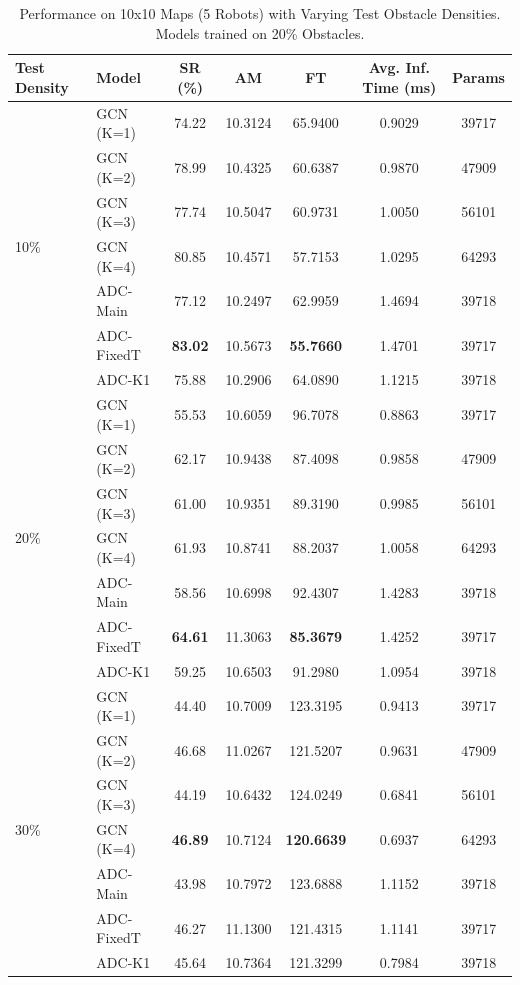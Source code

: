 \begin{table}[htbp]
    \centering
    \caption{Performance on 10x10 Maps (5 Robots) with Varying Test Obstacle Densities. Models trained on 20\% Obstacles.}
    \label{tab:density_perf_20D_train}
    \scriptsize %
    \begin{tabular}{llccccc}
        \toprule
        Test Density & Model & SR (\%) & AM & FT & Avg. Inf. Time (ms) & Params \\
        \midrule
        \multirow{7}{*}{10\%}
        & GCN (K=1) & 74.22 & 10.3124 & 65.9400 & 0.9029 & 39717 \\
        & GCN (K=2) & 78.99 & 10.4325 & 60.6387 & 0.9870 & 47909 \\
        & GCN (K=3) & 77.74 & 10.5047 & 60.9731 & 1.0050 & 56101 \\
        & GCN (K=4) & 80.85 & 10.4571 & 57.7153 & 1.0295 & 64293 \\
        & ADC-Main & 77.12 & 10.2497 & 62.9959 & 1.4694 & 39718 \\
        & ADC-FixedT & \textbf{83.02} & 10.5673 & \textbf{55.7660} & 1.4701 & 39717 \\
        & ADC-K1 & 75.88 & 10.2906 & 64.0890 & 1.1215 & 39718 \\
        \midrule
        \multirow{7}{*}{20\%}
        & GCN (K=1) & 55.53 & 10.6059 & 96.7078 & 0.8863 & 39717 \\
        & GCN (K=2) & 62.17 & 10.9438 & 87.4098 & 0.9858 & 47909 \\
        & GCN (K=3) & 61.00 & 10.9351 & 89.3190 & 0.9985 & 56101 \\
        & GCN (K=4) & 61.93 & 10.8741 & 88.2037 & 1.0058 & 64293 \\
        & ADC-Main & 58.56 & 10.6998 & 92.4307 & 1.4283 & 39718 \\
        & ADC-FixedT & \textbf{64.61} & 11.3063 & \textbf{85.3679} & 1.4252 & 39717 \\ 
        & ADC-K1 & 59.25 & 10.6503 & 91.2980 & 1.0954 & 39718 \\
        \midrule
        \multirow{7}{*}{30\%}
        & GCN (K=1) & 44.40 & 10.7009 & 123.3195 & 0.9413 & 39717 \\
        & GCN (K=2) & 46.68 & 11.0267 & 121.5207 & 0.9631 & 47909 \\
        & GCN (K=3) & 44.19 & 10.6432 & 124.0249 & 0.6841 & 56101 \\
        & GCN (K=4) & \textbf{46.89} & 10.7124 & \textbf{120.6639} & 0.6937 & 64293 \\
        & ADC-Main & 43.98 & 10.7972 & 123.6888 & 1.1152 & 39718 \\
        & ADC-FixedT & 46.27 & 11.1300 & 121.4315 & 1.1141 & 39717 \\
        & ADC-K1 & 45.64 & 10.7364 & 121.3299 & 0.7984 & 39718 \\
        \bottomrule
    \end{tabular}
\end{table}
